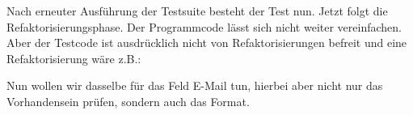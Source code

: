 \tddgreen
Nach erneuter Ausführung der Testsuite besteht der Test nun. Jetzt folgt die Refaktorisierungsphase. Der Programmcode lässt sich nicht weiter vereinfachen. Aber der Testcode ist ausdrücklich nicht von Refaktorisierungen befreit und eine Refaktorisierung wäre z.B.:
\tddrefactor
\begin{ruby}[label=test/unit/job\_test.rb]
  
       
   
\end{ruby}

Nun wollen wir dasselbe für das Feld E-Mail tun, hierbei aber nicht nur das Vorhandensein prüfen, sondern auch das Format.

